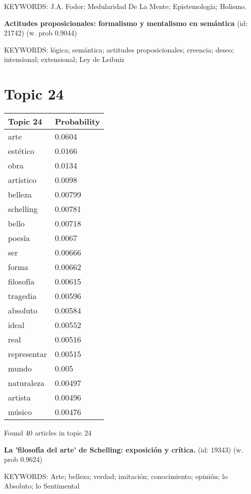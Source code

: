 \documentclass{article}
\begin{document}
KEYWORDS:
J.A. Fodor; Medularidad De La Mente; Epistemología; Holismo.
\vfill

\textbf{Actitudes proposicionales: formalismo y mentalismo en semántica} (id: 21742)
 (w. prob 0.9044)


KEYWORDS:
lógica; semántica; actitudes proposicionales; creencia; deseo; intensional; extensional; Ley de Leibniz

\vfill
\newpage


\centering
\thispagestyle{empty}
\section*{Topic 24}\vfill
\begin{tabular}{ll}
\toprule
    Topic 24 & Probability \\
\midrule
        arte &      0.0604 \\
    estético &      0.0166 \\
        obra &      0.0134 \\
   artístico &      0.0098 \\
     belleza &     0.00799 \\
   schelling &     0.00781 \\
       bello &     0.00718 \\
      poesía &      0.0067 \\
         ser &     0.00666 \\
       forma &     0.00662 \\
   filosofía &     0.00615 \\
    tragedia &     0.00596 \\
    absoluto &     0.00584 \\
       ideal &     0.00552 \\
        real &     0.00516 \\
 representar &     0.00515 \\
       mundo &       0.005 \\
  naturaleza &     0.00497 \\
     artista &     0.00496 \\
      músico &     0.00476 \\
\bottomrule
\end{tabular}

\vfill
Found 40 articles in topic 24
\vfill

\textbf{La 'filosofía del arte' de Schelling: exposición y crítica.} (id: 19343)
 (w. prob 0.9624)


KEYWORDS:
Arte; belleza; verdad; imitación; conocimiento; opinión; lo Absoluto; lo Sentimental
\vfill
\end{document}
